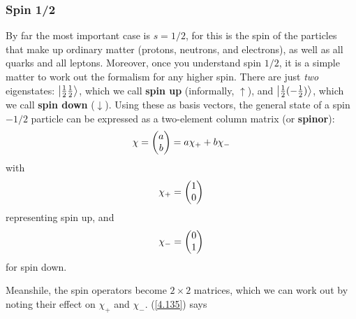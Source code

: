 \subsubsection{Spin 1/2}
By far the most important case is $s=1/2$, for this is the spin of the particles that make up ordinary matter (protons, neutrons, and electrons), as well as all quarks and all leptons. Moreover, once you understand spin $1/2$, it is a simple matter to work out the formalism for any higher spin. There are just \textit{two} eigenstates: $\ket{\frac{1}{2}\frac{1}{2}}$, which we call \textbf{spin up} (informally, $\uparrow$), and $\ket{\frac{1}{2}(-\frac{1}{2})}$, which we call \textbf{spin down} ($\downarrow$). Using these as basis vectors, the general state of a spin $-1/2$ particle can be expressed as a two-element column matrix (or \textbf{spinor}):
\begin{equation}\label{4.139}
	\chi=\mqty(a\\b)=a\chi_++b\chi_-
\end{equation}
with
\begin{equation}\label{4.140}
	\chi_+=\mqty(1\\0)
\end{equation}
representing spin up, and
\begin{equation}\label{4.141}
	\chi_-=\mqty(0\\1)
\end{equation}
for spin down.

Meanshile, the spin operators become $2\times 2$ matrices, which we can work out by noting their effect on $\chi_+$ and $\chi_-$. (\ref{4.135}) says














